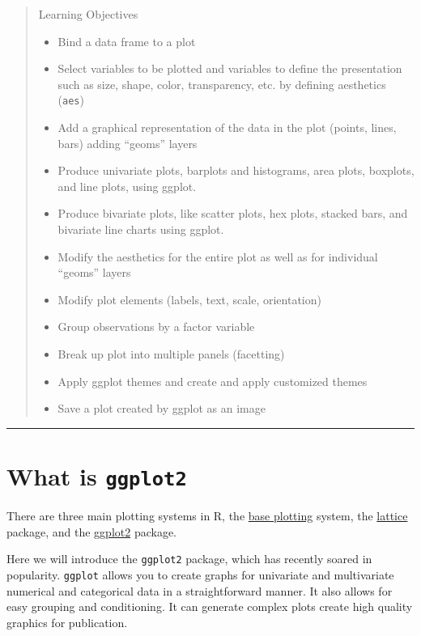 \documentclass[]{book}
\providecommand{\tightlist}{%
  \setlength{\itemsep}{0pt}\setlength{\parskip}{0pt}}
\theoremstyle{definition}
\theoremstyle{definition}
\theoremstyle{definition}
\theoremstyle{remark}
\begin{document}
\begin{quote}
Learning Objectives

\begin{itemize}
\tightlist
\item
  Bind a data frame to a plot
\item
  Select variables to be plotted and variables to define the
  presentation such as size, shape, color, transparency, etc. by
  defining aesthetics (\texttt{aes})
\item
  Add a graphical representation of the data in the plot (points, lines,
  bars) adding ``geoms'' layers
\item
  Produce univariate plots, barplots and histograms, area plots,
  boxplots, and line plots, using ggplot.
\item
  Produce bivariate plots, like scatter plots, hex plots, stacked bars,
  and bivariate line charts using ggplot.
\item
  Modify the aesthetics for the entire plot as well as for individual
  ``geoms'' layers
\item
  Modify plot elements (labels, text, scale, orientation)
\item
  Group observations by a factor variable
\item
  Break up plot into multiple panels (facetting)
\item
  Apply ggplot themes and create and apply customized themes
\item
  Save a plot created by ggplot as an image
\end{itemize}
\end{quote}

\begin{center}\rule{0.5\linewidth}{\linethickness}\end{center}

\section{\texorpdfstring{What is
\textbf{\texttt{ggplot2}}}{What is ggplot2}}\label{what-is-ggplot2}

There are three main plotting systems in R, the
\href{https://www.statmethods.net/graphs/index.html}{base plotting}
system, the
\href{https://www.statmethods.net/advgraphs/trellis.html}{lattice}
package, and the
\href{https://www.statmethods.net/advgraphs/ggplot2.html}{ggplot2}
package.

Here we will introduce the \texttt{ggplot2} package, which has recently
soared in popularity. \texttt{ggplot} allows you to create graphs for
univariate and multivariate numerical and categorical data in a
straightforward manner. It also allows for easy grouping and
conditioning. It can generate complex plots create high quality graphics
for publication.
\end{document}
